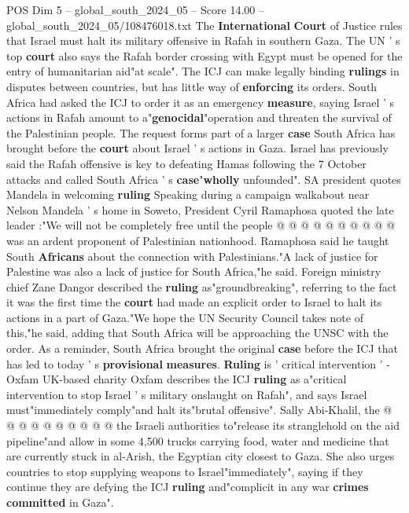 \begin{textsample}{POS Dim 5 – global\_south\_2024\_05 – Score 14.00 – global\_south\_2024\_05/108476018.txt}  \label{ex:f5_pos_129}
The \textbf{International} \textbf{Court} of Justice rules that Israel must halt its military offensive in Rafah in southern Gaza.
The UN ' s top \textbf{court} also says the Rafah border crossing with Egypt must be opened for the entry of humanitarian aid"at scale".
The ICJ can make legally binding \textbf{rulings} in disputes between countries, but has little way of \textbf{enforcing} its orders.
South Africa had asked the ICJ to order it as an emergency \textbf{measure}, saying Israel ' s actions in Rafah amount to a"\textbf{genocidal}"operation and threaten the survival of the Palestinian people.
The request forms part of a larger \textbf{case} South Africa has brought before the \textbf{court} about Israel ' s actions in Gaza.
Israel has previously said the Rafah offensive is key to defeating Hamas following the 7 October attacks and called South Africa ' s \textbf{case}"\textbf{wholly} unfounded".
SA president quotes Mandela in welcoming \textbf{ruling} Speaking during a campaign walkabout near Nelson Mandela ' s home in Soweto, President Cyril Ramaphosa quoted the late leader :"We will not be completely free until the people @ @ @ @ @ @ @ @ @ @ was an ardent proponent of Palestinian nationhood.
Ramaphosa said he taught South \textbf{Africans} about the connection with Palestinians."A lack of justice for Palestine was also a lack of justice for South Africa,"he said.
Foreign ministry chief Zane Dangor described the \textbf{ruling} as"groundbreaking", referring to the fact it was the first time the \textbf{court} had made an explicit order to Israel to halt its actions in a part of Gaza."We hope the UN Security Council takes note of this,"he said, adding that South Africa will be approaching the UNSC with the order.
As a reminder, South Africa brought the original \textbf{case} before the ICJ that has led to today ' s \textbf{provisional} \textbf{measures}. \textbf{Ruling} is ' critical intervention ' - Oxfam UK-based charity Oxfam describes the ICJ \textbf{ruling} as a"critical intervention to stop Israel ' s military onslaught on Rafah", and says Israel must"immediately comply"and halt its"brutal offensive".
Sally Abi-Khalil, the @ @ @ @ @ @ @ @ @ @ the Israeli authorities to"release its stranglehold on the aid pipeline"and allow in some 4,500 trucks carrying food, water and medicine that are currently stuck in al-Arish, the Egyptian city closest to Gaza.
She also urges countries to stop supplying weapons to Israel"immediately", saying if they continue they are defying the ICJ \textbf{ruling} and"complicit in any war \textbf{crimes} \textbf{committed} in Gaza".

\end{textsample}
